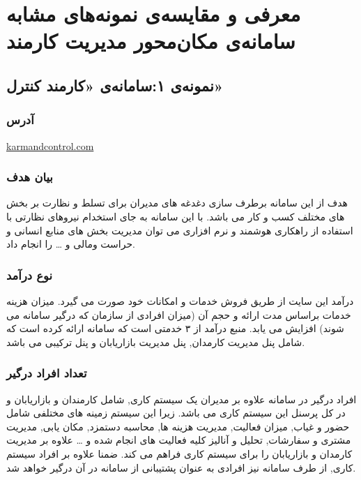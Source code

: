 
\section{معرفی و مقایسه‌ی نمونه‌های مشابه سامانه‌ی مکان‌محور مدیریت کارمند}

\subsection{نمونه‌ی ۱:‌سامانه‌ی «کارمند کنترل»}

\subsubsection{آدرس}
\url{karmandcontrol.com}

\subsubsection{بیان هدف}
هدف از این سامانه برطرف سازی دغدغه های مدیران برای تسلط و نظارت بر بخش های مختلف کسب و کار می باشد. با این سامانه به جای استخدام نیروهای نظارتی با استفاده از راهکاری هوشمند و نرم افزاری می توان مدیریت بخش های منابع انسانی و حراست ومالی و … را انجام داد.

\subsubsection{نوع درآمد}
درآمد این سایت از طریق فروش خدمات و امکانات خود صورت می گیرد. میزان هزینه خدمات براساس مدت ارائه و حجم آن‌ (میزان افرادی از سازمان که درگیر سامانه می شوند) افزایش می یابد. منبع درآمد از ۳ خدمتی است که سامانه ارائه کرده است که شامل پنل مدیریت کارمدان, پنل مدیریت بازاریابان و پنل ترکیبی می باشد.

\subsubsection{تعداد افراد درگیر}
افراد درگیر در سامانه علاوه بر مدیران یک سیستم کاری, شامل کارمندان و بازاریابان و در کل پرسنل این سیستم کاری می باشد. زیرا این سیستم زمینه های مختلفی شامل حضور و غیاب, میزان فعالیت, مدیریت هزینه ها, محاسبه دستمزد, مکان یابی, مدیریت مشتری و سفارشات, تحلیل و آنالیز کلیه فعالیت های انجام شده و … علاوه بر مدیریت کارمدان و بازاریابان را برای سیستم کاری فراهم می کند. ضمنا علاوه بر افراد سیستم کاری, از طرف سامانه نیز افرادی به عنوان پشتیبانی از سامانه در آن درگیر خواهد شد.

